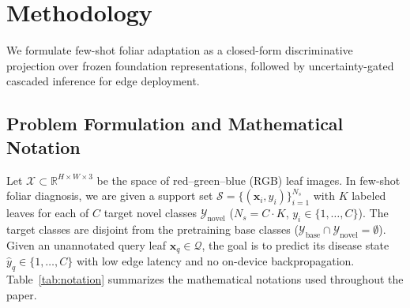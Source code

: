 \documentclass[preprint,12pt]{elsarticle}
\begin{document}
\section{Methodology}
\label{sec:methodology}
We formulate few-shot foliar adaptation as a closed-form discriminative projection over frozen foundation representations, followed by uncertainty-gated cascaded inference for edge deployment.

\subsection{Problem Formulation and Mathematical Notation}
\label{sec:notation}
Let $\mathcal{X} \subset \mathbb{R}^{H \times W \times 3}$ be the space of red--green--blue (RGB) leaf images. In few-shot foliar diagnosis, we are given a support set $\mathcal{S} = \{(\mathbf{x}_i, y_i)\}_{i=1}^{N_s}$ with $K$ labeled leaves for each of $C$ target novel classes $\mathcal{Y}_{\text{novel}}$ ($N_s = C \cdot K$, $y_i \in \{1, \dots, C\}$). The target classes are disjoint from the pretraining base classes ($\mathcal{Y}_{\text{base}} \cap \mathcal{Y}_{\text{novel}} = \emptyset$). Given an unannotated query leaf $\mathbf{x}_q \in \mathcal{Q}$, the goal is to predict its disease state $\hat{y}_q \in \{1, \dots, C\}$ with low edge latency and no on-device backpropagation. Table~\ref{tab:notation} summarizes the mathematical notations used throughout the paper.
\end{document}
